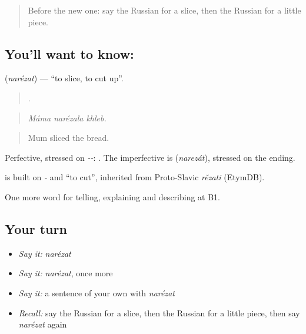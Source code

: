 \label{lesson:RU-C328-narezat}



\begin{quote}
Before the new one: say the Russian for a slice, then the Russian for a little piece.
\end{quote}

\subsection*{You'll want to know: }
\textbf{} (\emph{narézat}) — \textquotedblleft{}to slice, to cut up\textquotedblright{}.

\begin{quote}
  .
\end{quote}

\begin{quote}
\emph{Máma narézala khleb.}
\end{quote}

\begin{quote}
Mum sliced the bread.
\end{quote}

Perfective, stressed on \emph{--}: \emph{}. The imperfective is \emph{} (\emph{narezát}), stressed on the ending.

\begin{cousinweb}
\emph{} is built on \emph{-} and \emph{} \textquotedblleft{}to cut\textquotedblright{}, inherited from Proto-Slavic \emph{rězati} (EtymDB).
\end{cousinweb}

\begin{grammarlens}[title={What you've built}]
One more word for telling, explaining and describing at B1.
\end{grammarlens}

\subsection*{Your turn}
\begin{itemize}
\raggedright
  \item \emph{Say it:} \emph{narézat}
  \item \emph{Say it:} \emph{narézat}, once more
  \item \emph{Say it:} a sentence of your own with \emph{narézat}
  \item \emph{Recall:} say the Russian for a slice, then the Russian for a little piece, then say \emph{narézat} again
\end{itemize}

